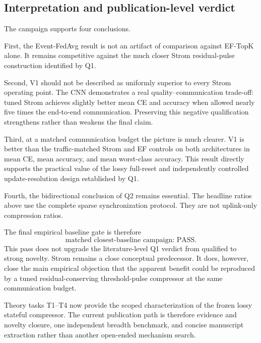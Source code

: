 \subsection{Interpretation and publication-level verdict}

The campaign supports four conclusions.

First, the Event-FedAvg result is not an artifact of comparison against EF-TopK alone. It remains competitive against the much closer Strom residual-pulse construction identified by Q1.

Second, V1 should not be described as uniformly superior to every Strom operating point. The CNN demonstrates a real quality--communication trade-off: tuned Strom achieves slightly better mean CE and accuracy when allowed nearly five times the end-to-end communication. Preserving this negative qualification strengthens rather than weakens the final claim.

Third, at a matched communication budget the picture is much clearer. V1 is better than the traffic-matched Strom and EF controls on both architectures in mean CE, mean accuracy, and mean worst-class accuracy. This result directly supports the practical value of the lossy full-reset and independently controlled update-resolution design established by Q1.

Fourth, the bidirectional conclusion of Q2 remains essential. The headline ratios above use the complete sparse synchronization protocol. They are not uplink-only compression ratios.

The final empirical baseline gate is therefore
\begin{equation}
    \boxed{\text{matched closest-baseline campaign: PASS}.}
\end{equation}
This pass does not upgrade the literature-level Q1 verdict from qualified to strong novelty. Strom remains a close conceptual predecessor. It does, however, close the main empirical objection that the apparent benefit could be reproduced by a tuned residual-conserving threshold-pulse compressor at the same communication budget.

Theory tasks T1--T4 now provide the scoped characterization of the frozen lossy stateful compressor. The current publication path is therefore evidence and novelty closure, one independent breadth benchmark, and concise manuscript extraction rather than another open-ended mechanism search.
